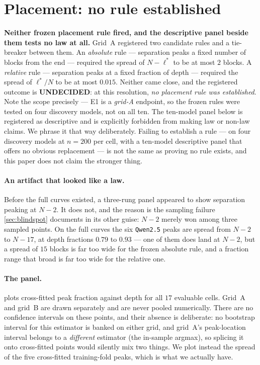 \documentclass[10pt, letterpaper]{article}
\begin{document}
\section{Placement: no rule established}
\label{sec:placement}

\textbf{Neither frozen placement rule fired, and the descriptive panel beside
them tests no law at all.} Grid~A registered two candidate
rules and a tie-breaker between them. An \emph{absolute} rule --- separation
peaks a fixed number of blocks from the end --- required the spread of $N-\ell^*$
to be at most $2$ blocks. A \emph{relative} rule --- separation peaks at a fixed
fraction of depth --- required the spread of $\ell^*/N$ to be at most $0.015$.
Neither came close, and the registered outcome is \textbf{UNDECIDED}: at this
resolution, \emph{no placement rule was established}. Note the scope precisely ---
E1 is a \emph{grid-A} endpoint, so the frozen rules were tested on four discovery
models, not on all ten. The ten-model panel below is registered as descriptive and
is explicitly forbidden from making law or non-law claims. We phrase it that way
deliberately. Failing to establish a rule --- on four discovery models at $n=200$
per cell, with a ten-model descriptive panel that offers no obvious replacement ---
is not the same as proving no rule exists, and this paper does not claim the
stronger thing.

\paragraph{An artifact that looked like a law.} Before the full curves existed, a
three-rung panel appeared to show separation peaking at $N-2$. It does not, and
the reason is the sampling failure \cref{sec:blindspot} documents in its other
guise: $N-2$ merely won among three sampled points. On the full curves the six
\texttt{Qwen2.5} peaks are spread from $N-2$ to $N-17$, at depth fractions $0.79$
to $0.93$ --- one of them does land at $N-2$, but a spread of $15$ blocks is far
too wide for the frozen absolute rule, and a fraction range that broad is far too
wide for the relative one.

\paragraph{The panel.}  plots cross-fitted peak fraction
against depth for all $17$ evaluable cells. Grid~A and grid~B are drawn
separately and are never pooled numerically. There are no confidence intervals on
these points, and their absence is deliberate: no bootstrap interval for this
estimator is banked on either grid, and grid~A's peak-location interval belongs
to a \emph{different} estimator (the in-sample argmax), so splicing it onto
cross-fitted points would silently mix two things. We plot instead the spread of
the five cross-fitted training-fold peaks, which is what we actually have.
\end{document}
